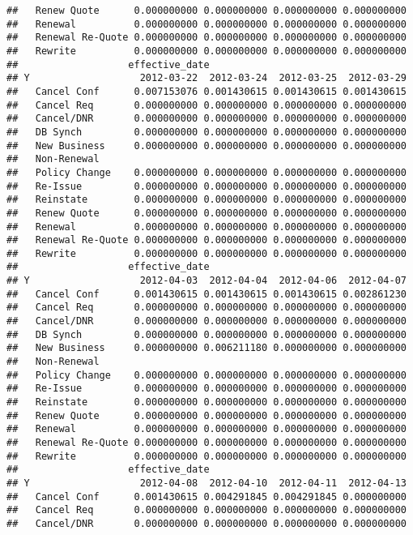 \documentclass[]{article}
\begin{document}
\begin{verbatim}
##   Renew Quote      0.000000000 0.000000000 0.000000000 0.000000000
##   Renewal          0.000000000 0.000000000 0.000000000 0.000000000
##   Renewal Re-Quote 0.000000000 0.000000000 0.000000000 0.000000000
##   Rewrite          0.000000000 0.000000000 0.000000000 0.000000000
##                   effective_date
## Y                   2012-03-22  2012-03-24  2012-03-25  2012-03-29
##   Cancel Conf      0.007153076 0.001430615 0.001430615 0.001430615
##   Cancel Req       0.000000000 0.000000000 0.000000000 0.000000000
##   Cancel/DNR       0.000000000 0.000000000 0.000000000 0.000000000
##   DB Synch         0.000000000 0.000000000 0.000000000 0.000000000
##   New Business     0.000000000 0.000000000 0.000000000 0.000000000
##   Non-Renewal                                                     
##   Policy Change    0.000000000 0.000000000 0.000000000 0.000000000
##   Re-Issue         0.000000000 0.000000000 0.000000000 0.000000000
##   Reinstate        0.000000000 0.000000000 0.000000000 0.000000000
##   Renew Quote      0.000000000 0.000000000 0.000000000 0.000000000
##   Renewal          0.000000000 0.000000000 0.000000000 0.000000000
##   Renewal Re-Quote 0.000000000 0.000000000 0.000000000 0.000000000
##   Rewrite          0.000000000 0.000000000 0.000000000 0.000000000
##                   effective_date
## Y                   2012-04-03  2012-04-04  2012-04-06  2012-04-07
##   Cancel Conf      0.001430615 0.001430615 0.001430615 0.002861230
##   Cancel Req       0.000000000 0.000000000 0.000000000 0.000000000
##   Cancel/DNR       0.000000000 0.000000000 0.000000000 0.000000000
##   DB Synch         0.000000000 0.000000000 0.000000000 0.000000000
##   New Business     0.000000000 0.006211180 0.000000000 0.000000000
##   Non-Renewal                                                     
##   Policy Change    0.000000000 0.000000000 0.000000000 0.000000000
##   Re-Issue         0.000000000 0.000000000 0.000000000 0.000000000
##   Reinstate        0.000000000 0.000000000 0.000000000 0.000000000
##   Renew Quote      0.000000000 0.000000000 0.000000000 0.000000000
##   Renewal          0.000000000 0.000000000 0.000000000 0.000000000
##   Renewal Re-Quote 0.000000000 0.000000000 0.000000000 0.000000000
##   Rewrite          0.000000000 0.000000000 0.000000000 0.000000000
##                   effective_date
## Y                   2012-04-08  2012-04-10  2012-04-11  2012-04-13
##   Cancel Conf      0.001430615 0.004291845 0.004291845 0.000000000
##   Cancel Req       0.000000000 0.000000000 0.000000000 0.000000000
##   Cancel/DNR       0.000000000 0.000000000 0.000000000 0.000000000

\end{verbatim}
\end{document}

